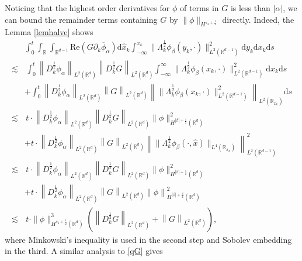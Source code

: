 \documentclass[10pt,twoside,a4paper]{article}
\numberwithin{equation}{section}\allowdisplaybreaks
\begin{document}
Noticing  that the highest order derivatives for $ \phi $ of terms in  $ G $ is less than  $ |\alpha|$,  we can bound the remainder terms containing $ G $ by $ \|\phi\|_{H^{s_3 +\frac 12}} $ directly. Indeed, the Lemma \ref{lemhalve}  shows
\begin{align} \label{cener_c1_5_1}
	&\int_0^t\int_{\mathbb{R}}  \int_{\mathbb{R}^{d-1}}  \mathrm{Re}\left( G \partial_k \overline{\phi}_\alpha \right) \mathrm{d} \hat{x}_k \int_{-\infty}^{x_k} \|\Lambda_k^{\frac 12}\phi_{\beta}(y_k,\cdot)\|^2_{L^2(\mathbb{R}^{d-1})} \mathrm{d} y_k  \mathrm{d} x_k \mathrm{d} s\nonumber\\
	\lesssim &\,\int_0^t \left\|   D_k^{\frac 12}\phi_\alpha\right\|_{L^2(\mathbb{R}^d)} \left\|   D_k^{\frac 12}G\right\|_{L^2(\mathbb{R}^d)}  \int_{-\infty}^{\infty} \|\Lambda_k^{\frac 12}\phi_{\beta}(x_k,\cdot)\|^2_{L^2(\mathbb{R}^{d-1})}\mathrm{d} x_k \mathrm{d} s\nonumber\\
	&+\int_0^t \left\|   D_k^{\frac 12}\phi_{\alpha}\right\|_{L^2(\mathbb{R}^d)} \left\|   G\right\|_{L^2(\mathbb{R}^d)} \left\| \|\Lambda_k^{\frac 12}\phi_{\beta}(x_k,\cdot)\|^2_{L^2(\mathbb{R}^{d-1})} \right\|_{L^2(\mathbb{R}_{x_k})}\mathrm{d} s\nonumber\\
	\lesssim &\,t\cdot\left\|   D_k^{\frac 12}\phi_\alpha\right\|_{L^2(\mathbb{R}^d)} \left\|   D_k^{\frac 12}G\right\|_{L^2(\mathbb{R}^d)} \|\phi\|^2_{H^{|\beta|+\frac 12}(\mathbb{R}^{d})} \\
	&+t \cdot\left\|   D_k^{\frac 12}\phi_{\alpha}\right\|_{L^2(\mathbb{R}^d)} \left\|   G\right\|_{L^2(\mathbb{R}^d)}  \left\| \| \Lambda_k^{\frac 12}\phi_\beta(\cdot,\hat{x})\|_{L^4(\mathbb{R}_{x_k})} \right\|_{L^{2}(\mathbb{R}^{d-1})}^2\nonumber\\
	\lesssim &\,t\cdot\left\|   D_k^{\frac 12}\phi_\alpha\right\|_{L^2(\mathbb{R}^d)} \left\|   D_k^{\frac 12}G\right\|_{L^2(\mathbb{R}^d)} \|\phi\|^2_{H^{ |\beta|+\frac 12}(\mathbb{R}^{d})} \nonumber\\
	&+t \cdot\left\|   D_k^{\frac 12}\phi_{\alpha}\right\|_{L^2(\mathbb{R}^d)} \left\|   G\right\|_{L^2(\mathbb{R}^d)}\left\| \phi \right\|^2_{H^{|\beta|+\frac 34}(\mathbb{R}^{d})}\nonumber\\
	\lesssim &\,t\cdot \|\phi\|^3_{H^{s_3+\frac 12}(\mathbb{R}^{d})} \left(\left\|   D_k^{\frac 12}G\right\|_{L^2(\mathbb{R}^d)}+\left\|  G\right\|_{L^2(\mathbb{R}^d)}\right), \nonumber
\end{align}
where Minkowski's inequality is used in the second step and Sobolev embedding in the third. A similar analysis to \eqref{qG} gives
\end{document}
